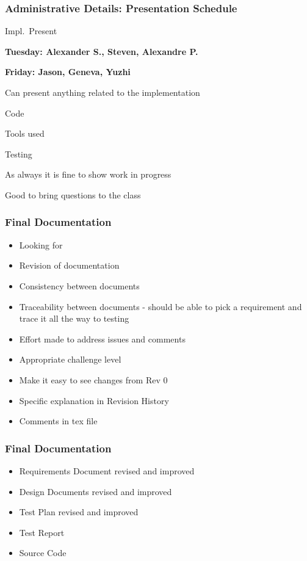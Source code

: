\documentclass[t,12pt,numbers,fleqn]{beamer}
\begin{document}

\begin{frame}
\frametitle{Administrative Details: Presentation Schedule}

\bi
\item {Impl.\ Present}
\bi
\item \textbf{Tuesday: Alexander S., Steven, Alexandre P.}
\item \textbf{Friday: Jason, Geneva, Yuzhi}
\ei
\item Can present anything related to the implementation
\bi
\item Code
\item Tools used
\item Testing
\item As always it is fine to show work in progress
\item Good to bring questions to the class
\ei
\ei

\end{frame}


\begin{frame}
\frametitle{Final Documentation}
\begin{itemize}
\item Looking for 
\bi
\item Revision of documentation
\item Consistency between documents
\item Traceability between documents - should be able to pick a requirement and
  trace it all the way to testing
\item Effort made to address issues and comments
\item Appropriate challenge level
\ei
\item Make it easy to see changes from Rev 0
\bi
\item Specific explanation in Revision History
\item Comments in tex file
\ei
\end{itemize}
\end{frame}


\begin{frame}
\frametitle{Final Documentation}
\begin{itemize}
\item Requirements Document revised and improved
\item Design Documents revised and improved
\item Test Plan revised and improved
\item Test Report
\item Source Code
\end{itemize}
\end{frame}
\end{document}
